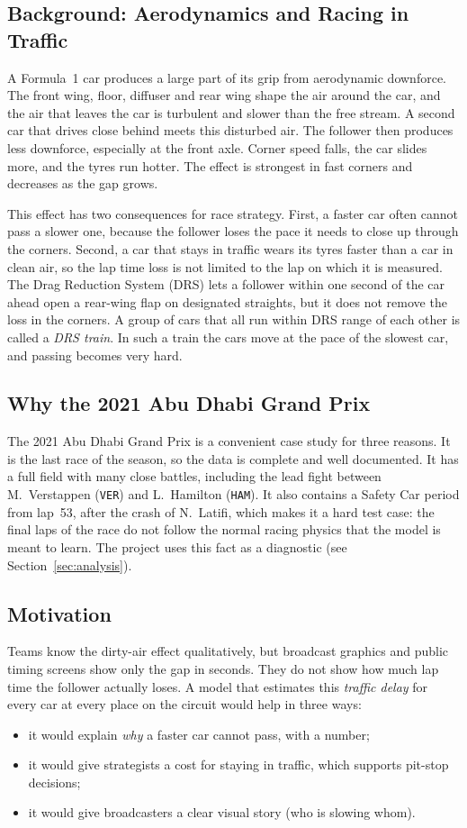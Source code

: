\documentclass[11pt,a4paper]{article}
\begin{document}
\subsection{Background: Aerodynamics and Racing in Traffic}
A Formula~1 car produces a large part of its grip from aerodynamic downforce.
The front wing, floor, diffuser and rear wing shape the air around the car, and
the air that leaves the car is turbulent and slower than the free stream. A
second car that drives close behind meets this disturbed air. The follower
then produces less downforce, especially at the front axle. Corner speed
falls, the car slides more, and the tyres run hotter. The effect is strongest
in fast corners and decreases as the gap grows.

This effect has two consequences for race strategy. First, a faster car often
cannot pass a slower one, because the follower loses the pace it needs to
close up through the corners. Second, a car that stays in traffic wears its
tyres faster than a car in clean air, so the lap time loss is not limited to
the lap on which it is measured. The Drag Reduction System (DRS) lets a
follower within one second of the car ahead open a rear-wing flap on
designated straights, but it does not remove the loss in the corners. A group
of cars that all run within DRS range of each other is called a \emph{DRS
train}. In such a train the cars move at the pace of the slowest car, and
passing becomes very hard.

\subsection{Why the 2021 Abu Dhabi Grand Prix}
The 2021 Abu Dhabi Grand Prix is a convenient case study for three reasons.
It is the last race of the season, so the data is complete and well documented.
It has a full field with many close battles, including the lead
fight between M.~Verstappen (\texttt{VER}) and L.~Hamilton (\texttt{HAM}).
It also contains a Safety Car period from lap~53, after the crash of
N.~Latifi, which makes it a hard test case: the final laps of the race do not
follow the normal racing physics that the model is meant to learn. The
project uses this fact as a diagnostic (see Section~\ref{sec:analysis}).

\subsection{Motivation}
Teams know the dirty-air effect qualitatively, but broadcast graphics and
public timing screens show only the gap in seconds. They do not show how much
lap time the follower actually loses. A model that estimates this
\emph{traffic delay} for every car at every place on the circuit would help in
three ways:
\begin{itemize}[leftmargin=*]
  \item it would explain \emph{why} a faster car cannot pass, with a number;
  \item it would give strategists a cost for staying in traffic, which
        supports pit-stop decisions;
  \item it would give broadcasters a clear visual story (who is slowing whom).
\end{itemize}
\end{document}
